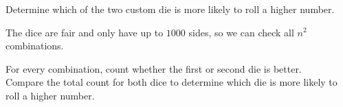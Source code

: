 \begin{frame}
    \frametitle{\problemtitle}
    \begin{description}
        \item<+->[Problem:] Determine which of the two custom die is more likely to roll a higher number.
        \item<+->[Observation:] The dice are fair and only have up to $1000$ sides, so we can check all $n^2$ combinations.
        \item<+->[Solution:] For every combination, count whether the first or second die is better. \\
            Compare the total count for both dice to determine which die is more likely to roll a higher number.
    \end{description}
    \solvestats
\end{frame}

